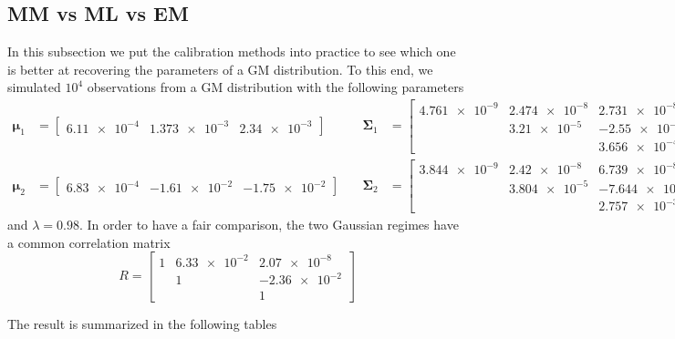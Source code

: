 \subsection{MM vs ML vs EM}
In this subsection we put the calibration methods into practice to see which one is better at recovering the parameters of a GM distribution. To this end, we simulated $10^4$ observations from a GM distribution with the following parameters
\begin{align*}
\bm{\mu}_1 & = 
\begin{bmatrix}
\num{6.11e-4} &  \num{1.373e-3} &  \num{2.34e-3}
\end{bmatrix}
\quad & \bm{\Sigma}_1 &= 
\begin{bmatrix}
\num{4.761e-9} & \num{2.474e-8} & \num{2.731e-8} \\
               & \num{3.21e-5}  & \num{-2.55e-6} \\
               &                & \num{3.656e-4}
\end{bmatrix} \\
\bm{\mu}_2 & = \begin{bmatrix}
\num{6.83e-4} &  \num{-1.61e-2} &  \num{-1.75e-2}
\end{bmatrix}
\quad & \bm{\Sigma}_2 &= 
\begin{bmatrix}
\num{3.844e-9} & \num{2.42e-8} & \num{6.739e-8} \\
               & \num{3.804e-5}  & \num{-7.644e-6} \\
               &                & \num{2.757e-3}
\end{bmatrix}
\end{align*}
and $\lambda = 0.98$. In order to have a fair comparison, the two Gaussian regimes have a common correlation matrix \[ R = 
\begin{bmatrix}
\num{1} & \num{6.33e-2} & \num{2.07e-8} \\
        & \num{1}       & \num{-2.36e-2} \\
        &                & \num{1}
\end{bmatrix}\]

The result is summarized in the following tables

